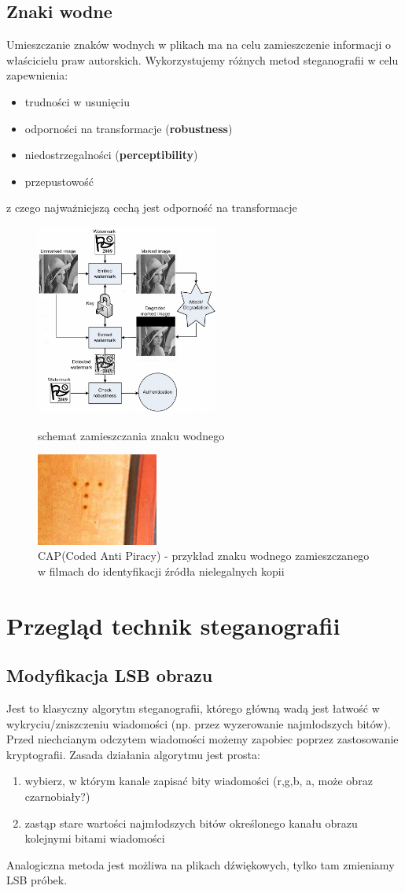 \documentclass{article}
\begin{document}
\subsection{Znaki wodne}
Umieszczanie znaków wodnych w plikach ma na celu zamieszczenie informacji o właścicielu praw autorskich.
Wykorzystujemy różnych metod steganografii w celu zapewnienia:
\begin{itemize}
	\item trudności w usunięciu
	\item odporności na transformacje (\textbf{robustness})
	\item niedostrzegalności (\textbf{perceptibility})
	\item przepustowość
\end{itemize} 
z czego najważniejszą cechą jest odporność na transformacje
\begin{figure}[H]
	\centering
	\includegraphics[width=6cm]{watermark}
	\caption{schemat zamieszczania znaku wodnego}
	\includegraphics[width=4cm]{cap}
	\caption{CAP(Coded Anti Piracy) - przykład znaku wodnego zamieszczanego w filmach do identyfikacji źródła nielegalnych kopii}
\end{figure}
\section{Przegląd technik steganografii}
\subsection{Modyfikacja LSB obrazu}
Jest to klasyczny algorytm steganografii, którego główną wadą jest łatwość w wykryciu/zniszczeniu wiadomości
(np. przez wyzerowanie najmłodszych bitów). Przed niechcianym odczytem wiadomości możemy zapobiec 
poprzez zastosowanie kryptografii. Zasada działania algorytmu jest prosta:
\begin{enumerate}
	\item wybierz, w którym kanale zapisać bity wiadomości (r,g,b, a, może obraz czarnobiały?)
	\item zastąp stare wartości najmłodszych bitów określonego kanału obrazu kolejnymi bitami wiadomości
\end{enumerate}
Analogiczna metoda jest możliwa na plikach dźwiękowych, tylko tam zmieniamy LSB próbek.
\end{document}
